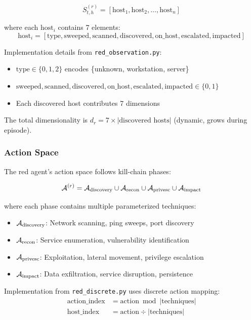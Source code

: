 \documentclass[11pt]{article}
\newcounter{phase}[algorithm]
\theoremstyle{definition}
\theoremstyle{plain}
\begin{document}
\begin{equation}
S_{t,h}^{(r)} = [\text{host}_1, \text{host}_2, \ldots, \text{host}_n]
\end{equation}

where each $\text{host}_i$ contains 7 elements:
\begin{equation}
\text{host}_i = [\text{type}, \text{sweeped}, \text{scanned}, \text{discovered}, \text{on\_host}, \text{escalated}, \text{impacted}]
\end{equation}

Implementation details from \texttt{red\_observation.py}:
\begin{itemize}
    \item $\text{type} \in \{0, 1, 2\}$ encodes \{unknown, workstation, server\}
    \item $\text{sweeped}, \text{scanned}, \text{discovered}, \text{on\_host}, \text{escalated}, \text{impacted} \in \{0, 1\}$
    \item Each discovered host contributes 7 dimensions
\end{itemize}

The total dimensionality is $d_r = 7 \times |\text{discovered hosts}|$ (dynamic, grows during episode).

\subsubsection{Action Space}
The red agent's action space follows kill-chain phases:

\begin{equation}
\mathcal{A}^{(r)} = \mathcal{A}_{\text{discovery}} \cup \mathcal{A}_{\text{recon}} \cup \mathcal{A}_{\text{privesc}} \cup \mathcal{A}_{\text{impact}}
\end{equation}

where each phase contains multiple parameterized techniques:
\begin{itemize}
    \item $\mathcal{A}_{\text{discovery}}$: Network scanning, ping sweeps, port discovery
    \item $\mathcal{A}_{\text{recon}}$: Service enumeration, vulnerability identification
    \item $\mathcal{A}_{\text{privesc}}$: Exploitation, lateral movement, privilege escalation
    \item $\mathcal{A}_{\text{impact}}$: Data exfiltration, service disruption, persistence
\end{itemize}

Implementation from \texttt{red\_discrete.py} uses discrete action mapping:
\begin{align}
\text{action\_index} &= \text{action} \bmod |\text{techniques}| \\
\text{host\_index} &= \text{action} \div |\text{techniques}|
\end{align}
\end{document}
